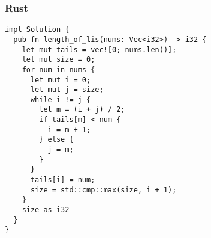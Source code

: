 \subsubsection{Rust}

\begin{verbatim}
impl Solution {
  pub fn length_of_lis(nums: Vec<i32>) -> i32 {
    let mut tails = vec![0; nums.len()];
    let mut size = 0;
    for num in nums {
      let mut i = 0;
      let mut j = size;
      while i != j {
        let m = (i + j) / 2;
        if tails[m] < num {
          i = m + 1;
        } else {
          j = m;
        }
      }
      tails[i] = num;
      size = std::cmp::max(size, i + 1);
    }
    size as i32
  }
}
\end{verbatim}
